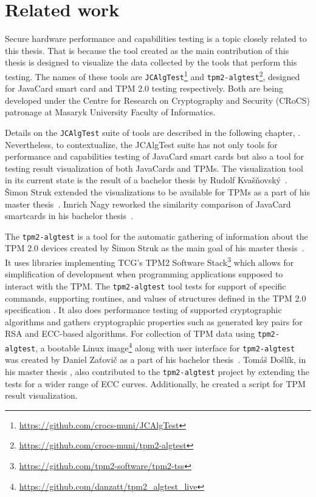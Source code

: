 \section{Related work}
Secure hardware performance and capabilities testing is a topic closely related to this thesis. That is because the tool created as the main contribution of this thesis is designed to visualize the data collected by the tools that perform this testing. The names of these tools are \texttt{JCAlgTest}\footnote{\url{https://github.com/crocs-muni/JCAlgTest}} and \texttt{tpm2-algtest}\footnote{\url{https://github.com/crocs-muni/tpm2-algtest}}, designed for JavaCard smart card and TPM 2.0 testing respectively. Both are being developed under the Centre for Research on Cryptography and Security (CRoCS) patronage at Masaryk University Faculty of Informatics.

Details on the \texttt{JCAlgTest} suite of tools are described in the following chapter, . Nevertheless, to contextualize, the JCAlgTest suite has not only tools for performance and capabilities testing of JavaCard smart cards but also a tool for testing result visualization of both JavaCards and TPMs. The visualization tool in its current state is the result of a bachelor thesis by Rudolf Kvašňovský~\cite{Kvasnovsky2016thesis}. Šimon Struk extended the visualizations to be available for TPMs as a part of his master thesis~\cite{Struk2019thesis}. Imrich Nagy reworked the similarity comparison of JavaCard smartcards in his bachelor thesis~\cite{Nagy2019thesis}.

 The \texttt{tpm2-algtest} is a tool for the automatic gathering of information about the TPM 2.0 devices created by Šimon Struk as the main goal of his master thesis~\cite{Struk2019thesis}. It uses libraries implementing TCG's TPM2 Software Stack\footnote{\url{https://github.com/tpm2-software/tpm2-tss}} which allows for simplification of development when programming applications supposed to interact with the TPM. The \texttt{tpm2-algtest} tool tests for support of specific commands, supporting routines, and values of structures defined in the TPM 2.0 specification \cite{tcg_p3_commands, tcg_p4_supproutines, tcg_p2_structures}. It also does performance testing of supported cryptographic algorithms and gathers cryptographic properties such as generated key pairs for RSA and ECC-based algorithms. For collection of TPM data using \texttt{tpm2-algtest}, a bootable Linux image\footnote{\url{https://github.com/danzatt/tpm2_algtest_live}} along with user interface for \texttt{tpm2-algtest} was created by Daniel Zaťovič as a part of his bachelor thesis~\cite{Zatovic2020thesis}. Tomáš Došlík, in his master thesis \cite{Doslik2021thesis}, also contributed to the \texttt{tpm2-algtest} project by extending the tests for a wider range of ECC curves. Additionally, he created a script for TPM result visualization. 